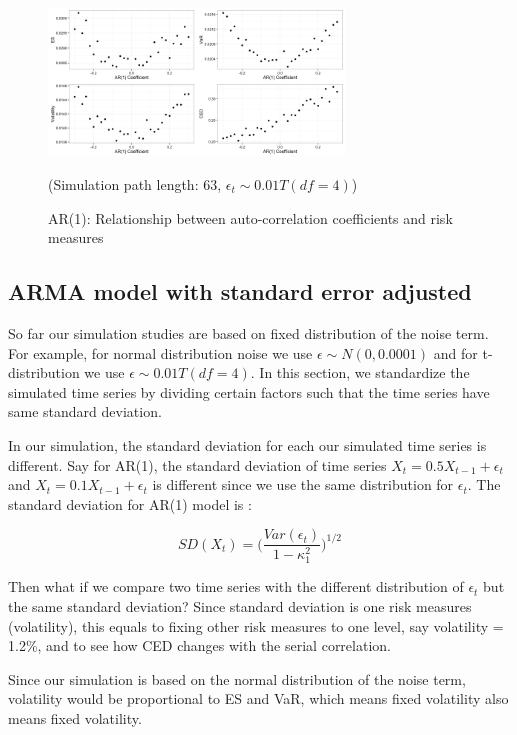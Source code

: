 \documentclass[11pt]{article}
\begin{document}
\begin{figure}[H]
\centering
\includegraphics[width = 0.7\textwidth]{../figures/simulation/T_dist_AR1_risk_measures}
\caption{AR(1): Relationship between auto-correlation coefficients and risk measures}
(Simulation path length: 63, $\epsilon_t \sim 0.01T(df = 4)$)
\label{fig:T_dist_AR1_risk_measures}
\end{figure} 

\subsection{ARMA model with standard error adjusted}

So far our simulation studies are based on fixed distribution of the noise term. For example, for normal distribution noise we use $\epsilon \sim N(0, 0.0001)$ and for t-distribution we use $\epsilon \sim 0.01T(df =4)$. In this section, we standardize the simulated time series by dividing certain factors such that the time series have same standard deviation. 

In our simulation, the standard deviation for each our simulated time series is different. Say for AR(1), the standard deviation of time series $X_t = 0.5  X_{t-1} + \epsilon_t$ and $X_t = 0.1  X_{t-1} + \epsilon_t$ is different since we use the same distribution for $\epsilon_t$. The standard deviation for AR(1) model is :

\begin{equation}
SD(X_t) = \Big(\frac{Var(\epsilon_t)}{1-\kappa_1^2}\Big)^{1/2}
\end{equation}

Then what if we compare two time series with the different distribution of $\epsilon_t$ but the same standard deviation? Since standard deviation is one risk measures (volatility), this equals to fixing other risk measures to one level, say volatility = 1.2\%, and to see how CED changes with the serial correlation. 

Since our simulation is based on the normal distribution of the noise term, volatility would be proportional to ES and VaR, which means fixed volatility also means fixed volatility. 
\end{document}
